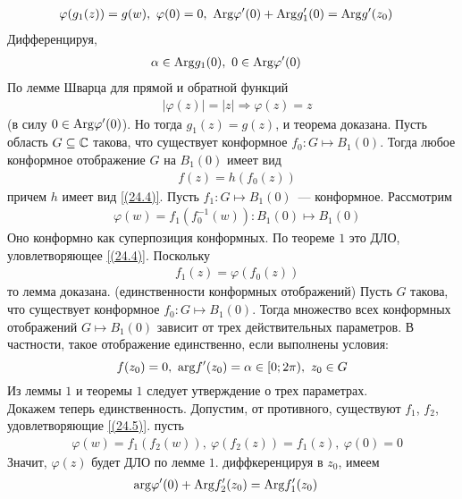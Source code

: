 \begin{align*}
&\varphi(g_1(z)) = g(w), \ \varphi(0) = 0, \ \mathrm{Arg} \varphi'(0) + \mathrm{Arg} g_1'(0) = \mathrm{Arg} g'(z_0)
\end{align*}
Дифференцируя,
\begin{align*}
& \alpha \in \mathrm{Arg} g_1(0), \ 0 \in \mathrm{Arg} \varphi'(0)
\end{align*}
По лемме Шварца для прямой и обратной функций
\begin{align*}
& \left| \varphi(z) \right| = \left| z \right| \Rightarrow \varphi(z) = z
\end{align*}
(в силу $0 \in \mathrm{Arg} \varphi'(0)$). Но тогда $g_1(z) = g(z)$, и теорема
доказана.
\lemma 
Пусть область $G\subseteq \mathbb{C}$ такова, что существует конформное $f_0: G \mapsto
B_1(0)$. Тогда любое конформное отображение $G$ на $B_1(0)$ имеет вид
\begin{align*}
  & f(z) = h(f_0(z))
\end{align*}
причем $h$ имеет вид \eqref{(24.4)}.
\pr
Пусть $f_1: G \mapsto B_1(0)$~--- конформное. Рассмотрим 
\begin{align*}
  & \varphi(w) = f_1(f_0^{-1}(w)): B_1(0) \mapsto B_1(0)
\end{align*}
Оно конформно как суперпозиция конформных. По теореме $1$ это ДЛО,
уловлетворяющее \eqref{(24.4)}. Поскольку
\begin{align*}
& f_1(z) = \varphi(f_0(z))
\end{align*}
то лемма доказана.
\theorem (единственности конформных отображений)
Пусть $G$ такова, что существует конформное $f_0:G \mapsto B_1(0)$. Тогда
множество всех конформных отображений $G \mapsto B_1(0)$ зависит от трех
действительных параметров. В частности, такое отображение единственно, если
выполнены условия:
\begin{equation}\label{(24.5)}
f(z_0) = 0, \ \mathrm{arg} f'(z_0) = \alpha \in [0;2\pi), \ z_0 \in G
\end{equation}
\pr
Из леммы $1$ и теоремы $1$ следует утверждение о трех параметрах.
\\
Докажем теперь единственность. Допустим, от противного, существуют $f_1$, $f_2$,
удовлетворяющие \eqref{(24.5)}. пусть
\begin{align*}
  & \varphi(w) = f_1(f_2(w)), \ \varphi(f_2(z)) = f_1(z), \ \varphi(0) = 0
\end{align*}
Значит, $\varphi(z)$ будет ДЛО по лемме $1$. диффкеренцируя в $z_0$, имеем
\begin{align*}
    & \mathrm{arg} \varphi'(0) + \mathrm{Arg} f_2'(z_0) = \mathrm{Arg} f_1'(z_0)
\end{align*}
